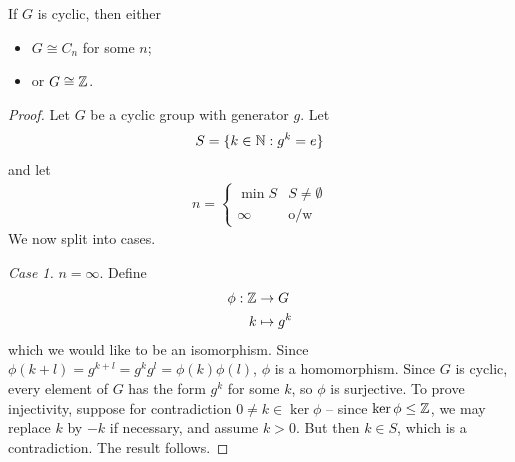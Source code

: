 \documentclass{../template/note}
\begin{document}
    \begin{theorem}
        If \(G\) is cyclic, then either
        \begin{itemize}
            \item \(G \cong C_n\) for some \(n\);
            \item or \(G \cong \mathbb Z\).
        \end{itemize}
    \end{theorem}
    
    \begin{proof}
        Let \(G\) be a cyclic group with generator \(g\). Let
        \begin{align*}
            S = \{k \in \mathbb N: g^k = e\}
        \end{align*}
        and let
        \begin{align*}
            n = \begin{cases}
                \min S & S \neq \emptyset \\
                \infty & \text{o/w}
            \end{cases}
        \end{align*}
        We now split into cases.

        \emph{Case 1.} \(n = \infty\). Define
        \begin{align*}
            \phi: \mathbb Z &\to G \\
            k &\mapsto g^k
        \end{align*}
        which we would like to be an isomorphism. Since \(\phi(k+l) = g^{k+l} = g^kg^l = \phi(k)\phi(l)\), \(\phi\) is a homomorphism. Since \(G\) is cyclic, every element of \(G\) has the form \(g^k\) for some \(k\), so \(\phi\) is surjective. To prove injectivity, suppose for contradiction \(0 \neq k \in \ker \phi\) -- since \(\ker \phi \leq \mathbb Z\), we may replace \(k\) by \(-k\) if necessary, and assume \(k > 0\). But then \(k \in S\), which is a contradiction. The result follows.
        

\end{proof}
\end{document}
